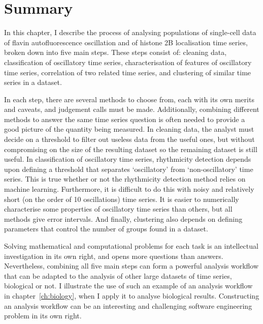 \section{Summary}
\label{sec:analysis-summary}

In this chapter, I describe the process of analysing populations of single-cell data of flavin autofluorescence oscillation and of histone 2B localisation time series, broken down into five main steps.
These steps consist of: cleaning data, classification of oscillatory time series, characterisation of features of oscillatory time series, correlation of two related time series, and clustering of similar time series in a dataset.

In each step, there are several methods to choose from, each with its own merits and caveats, and judgement calls must be made.
Additionally, combining different methods to answer the same time series question is often needed to provide a good picture of the quantity being measured.
In cleaning data, the analyst must decide on a threshold to filter out useless data from the useful ones, but without compromising on the size of the resulting dataset so the remaining dataset is still useful.
In classification of oscillatory time series, rhythmicity detection depends upon defining a threshold that separates `oscillatory' from `non-oscillatory' time series.
This is true whether or not the rhythmicity detection method relies on machine learning.
Furthermore, it is difficult to do this with noisy and relatively short (on the order of 10 oscillations) time series.
It is easier to numerically characterise some properties of oscillatory time series than others, but all methods give error intervals.
And finally, clustering also depends on defining parameters that control the number of groups found in a dataset.

Solving mathematical and computational problems for each task is an intellectual investigation in its own right, and opens more questions than answers.
Nevertheless, combining all five main steps can form a powerful analysis workflow that can be adapted to the analysis of other large datasets of time series, biological or not.
I illustrate the use of such an example of an analysis workflow in chapter~\ref{ch:biology}, when I apply it to analyse biological results.
Constructing an analysis workflow can be an interesting and challenging software engineering problem in its own right.

